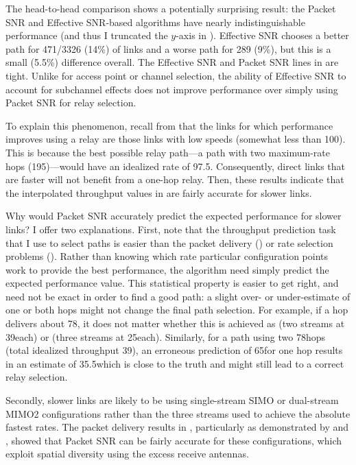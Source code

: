 The head-to-head comparison shows a potentially surprising result: the Packet SNR and Effective SNR-based algorithms have nearly indistinguishable performance (and thus I truncated the $y$-axis in ). Effective SNR chooses a better path for 471/3326 (14\%) of links and a worse path for 289 (9\%), but this is a small (5.5\%) difference overall. The Effective SNR and Packet SNR lines in  are tight. Unlike for access point or channel selection, the ability of Effective SNR to account for subchannel effects does not improve performance over simply using Packet SNR for relay selection.

To explain this phenomenon, recall from  that the links for which performance improves using a relay are those links with low speeds (somewhat less than 100\Mbps). This is because the best possible relay path---a path with two maximum-rate hops (195\Mbps)---would have an idealized rate of 97.5\Mbps. Consequently, direct links that are faster will not benefit from a one-hop relay. Then, these results indicate that the interpolated throughput values in  are fairly accurate for slower links.

Why would Packet SNR accurately predict the expected performance for slower links? I offer two explanations. First, note that the throughput prediction task that I use to select paths is easier than the packet delivery () or rate selection problems (). Rather than knowing which rate particular configuration points work to provide the best performance, the algorithm need simply predict the expected performance value. This statistical property is easier to get right, and need not be exact in order to find a good path: a slight over- or under-estimate of one or both hops might not change the final path selection. For example, if a hop delivers about 78\Mbps, it does not matter whether this is achieved as  (two streams at 39\Mbps each) or  (three streams at 25\Mbps each). Similarly, for a path using two 78\Mbps hops (total idealized throughput 39\Mbps), an erroneous prediction of 65\Mbps for one hop results in an estimate of 35.5\Mbps which is close to the truth and might still lead to a correct relay selection.

Secondly, slower links are likely to be using single-stream SIMO or dual-stream MIMO2 configurations rather than the three streams used to achieve the absolute fastest rates. The packet delivery results in , particularly as demonstrated by  and , showed that Packet SNR can be fairly accurate for these configurations, which exploit spatial diversity using the excess receive antennas.

